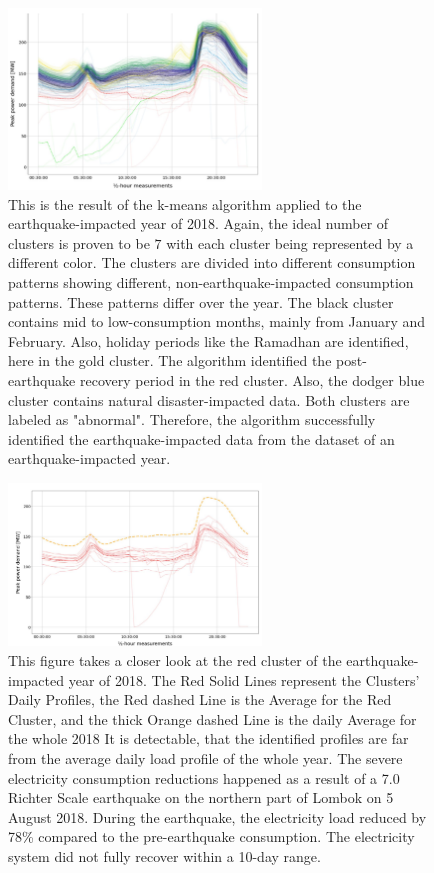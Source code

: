 \begin{figure}[H]
    \centering
    \includegraphics[width=0.6\textwidth]{figures/jessen_ndImpactedClusters/jessen_Clustering2018.png}
    \caption{This is the result of the k-means algorithm applied to the earthquake-impacted year of 2018.
    Again, the ideal number of clusters is proven to be $7$ with each cluster being represented by a different color.
    The clusters are divided into different consumption patterns showing different, non-earthquake-impacted consumption patterns.
    These patterns differ over the year.
    The black cluster contains mid to low-consumption months, mainly from January and February.
    Also, holiday periods like the Ramadhan are identified, here in the gold cluster.
    The algorithm identified the post-earthquake recovery period in the red cluster.
    Also, the dodger blue cluster contains natural disaster-impacted data.
    Both clusters are labeled as "abnormal".
    Therefore, the algorithm successfully identified the earthquake-impacted data from the dataset of an earthquake-impacted year.
    }
    \label{fig:clustering_results_2018}
\end{figure}

\begin{figure}[H]
    \centering
    \includegraphics[width=0.6\textwidth]{figures/jessen_ndImpactedClusters/jessen_ClusterTwo2018.png}
    \caption{This figure takes a closer look at the red cluster of the earthquake-impacted year of 2018.
    The Red Solid Lines represent the Clusters' Daily Profiles, the Red dashed Line is the Average for the Red Cluster, and the thick Orange dashed Line is the daily Average for the whole 2018
    It is detectable, that the identified profiles are far from the average daily load profile of the whole year.
    The severe electricity consumption reductions happened as a result of a 7.0 Richter Scale earthquake on the northern part of Lombok on 5 August 2018.
    During the earthquake, the electricity load reduced by 78\% compared to the pre-earthquake consumption.
    The electricity system did not fully recover within a 10-day range.
    }
    \label{fig:clustering_results_2018_cluster_two}
\end{figure}

